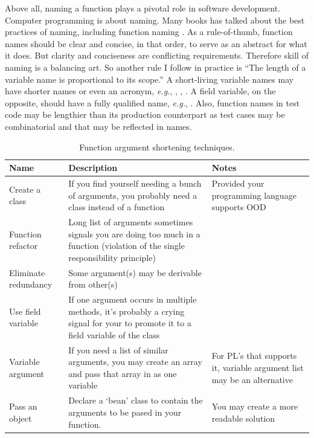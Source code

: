 Above all, naming a function plays a pivotal role in software development.
Computer programming is about naming.
Many books has talked about the best practices of naming, including function naming
\cite{Martin-R-2009, Mcconnell.2004}.
As a rule-of-thumb, function names should be clear and concise, in that order, to serve as an
abstract for what it does.
But clarity and conciseness are conflicting requirements.
Therefore skill of naming is a balancing art.
So another rule I follow in practice is ``The length of a variable name is proportional to its
scope.''
A short-living variable names may have shorter names or even an acronym, \textit{e.g.}, ,
, .
A field variable, on the opposite, should have a fully qualified name, \textit{e.g.},
.
Also, function names in test code may be lengthier than its production counterpart as test cases
may be combinatorial and that may be reflected in names.

\begin{table}[h]
    \begin{center}
        \caption{Function argument shortening techniques.\label{tbl:arg-shorten-tech}}
        \begin{tabular}{|l|p{5cm}|p{3cm}|}
            \hline
            Name & Description & Notes \\
            \hline
            Create a class
            & If you find yourself needing a bunch of arguments, you
            probably need a class instead of a function
            & Provided your programming language supports OOD \\
            \hline
            Function refactor
            & Long list of arguments sometimes signals you are doing
            too much in a function (violation of the single responsibility principle)
            & \\
            \hline
            Eliminate redundancy
            & Some argument(s) may be derivable from other(s)
            & \\
            \hline
            Use field variable
            & If one argument occurs in multiple methods, it's probably a
            crying signal for your to promote it to a field variable of the class
            & \\
            \hline
            Variable argument
            & If you need a list of similar arguments, you may create an array
            and pass that array in as one variable
            & For PL's that supports it, variable argument list may be an alternative \\
            \hline
            Pass an object
            & Declare a `bean' class to contain the arguments to be pased in your function.
            & You may create a more readable solution \\
            \hline
        \end{tabular}
    \end{center}
\end{table}

